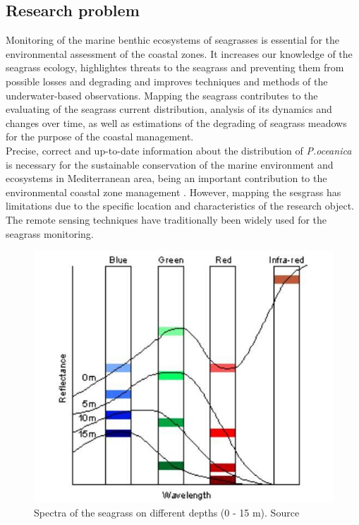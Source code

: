 \documentclass[10pt, a4paper]{article}
\begin{document}
\subsection{Research problem}
Monitoring of the marine benthic ecosystems of seagrasses is essential for the environmental
assessment of the coastal zones. It increases our knowledge of the seagrass ecology, highlightes
threats to the seagrass and preventing them from possible losses and degrading and improves
techniques and methods of the underwater-based observations. Mapping the seagrass contributes to
the evaluating of the seagrass current distribution, analysis of its dynamics and changes over time, as
well as estimations of the degrading of seagrass meadows for the purpose of the coastal management.\\
Precise, correct and up-to-date information about the distribution of \textit{P.oceanica} is necessary for the
sustainable conservation of the marine environment and ecosystems in Mediterranean area, being an
important contribution to the environmental coastal zone management \cite{Pergent-Martini06}\label{Pergent-Martini06}.
However, mapping the sesgrass has limitations due to the specific location and characteristics of the
research object. The remote sensing techniques have traditionally been widely used for the seagrass
monitoring. 

\begin{figure}
	\centering
	\includegraphics[scale=0.25]{Fig-1-9.jpg}
	\caption{Spectra of the seagrass on different depths (0 - 15 m). Source \cite{Edwards00}\label{Edwards00}}
	\label{fig:9}
\end{figure}
\end{document}
